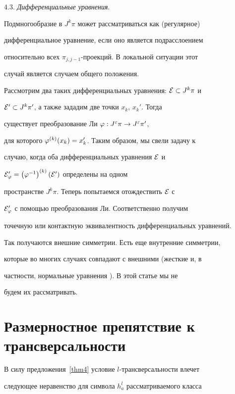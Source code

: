 4.3. {\it Дифференциальные уравнения}.


Подмногообразие в $J^k\pi$ может рассматриваться как (регулярное)


дифференциальное уравнение, если оно является подрасслоением


относительно всех $\pi_{j,j-1}$-проекций. В локальной ситуации этот


случай является случаем общего положения.





Рассмотрим два таких дифференциальных уравнения: ${\cal E}\subset J^k\pi$ и


${\cal E}'\subset J^k\pi'$, а также зададим две точки $x_k$, $x_k'$. Тогда


существует преобразование Ли $\varphi:J^\varepsilon\pi\to J^\varepsilon\pi'$,


для которого $\varphi^{(k)}(x_k)=x_k'$. Таким образом, мы свели задачу к


случаю, когда оба дифференциальных уравнения ${\cal E}$ и


${\cal E}'_\varphi=\left(\varphi^{-1}\right)^{(k)}({\cal E}')$ определены на одном


пространстве $J^k\pi$. Теперь попытаемся отождествить ${\cal E}$ с


${\cal E}'_\varphi$ с помощью преобразования Ли. Соответственно получим


точечную или контактную эквивалентность дифференциальных уравнений.





Так получаются внешние симметрии. Есть еще внутренние симметрии,


которые во многих случаях совпадают с внешними (жесткие и, в


частности, нормальные уравнения \cite{KLV}). В этой статье мы не


будем их рассматривать.








\section{Размерностное препятствие к трансверсальности}





В силу предложения~\ref{thm4} условие $l$-трансверсальности влечет


следующее неравенство для символа $h_a^l$ рассматриваемого класса


